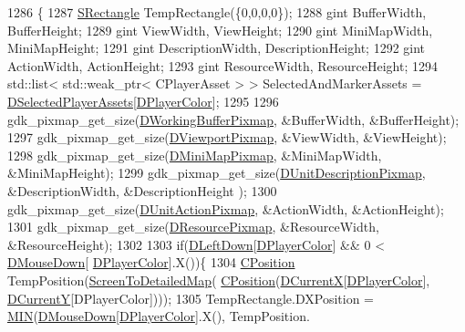 \begin{DoxyCode}
1286                                      \{
1287     \hyperlink{structSRectangle}{SRectangle} TempRectangle(\{0,0,0,0\});
1288     gint BufferWidth, BufferHeight;
1289     gint ViewWidth, ViewHeight;
1290     gint MiniMapWidth, MiniMapHeight;
1291     gint DescriptionWidth, DescriptionHeight;
1292     gint ActionWidth, ActionHeight;
1293     gint ResourceWidth, ResourceHeight;
1294     std::list< std::weak\_ptr< CPlayerAsset > > SelectedAndMarkerAssets = 
      \hyperlink{classCApplicationData_a05c1087d5a5c4ddc14fcb37444f1642b}{DSelectedPlayerAssets}[\hyperlink{classCApplicationData_a53550939b20cba70570f113e4d1c5d02}{DPlayerColor}];
1295 
1296     gdk\_pixmap\_get\_size(\hyperlink{classCApplicationData_afa34cf2780f38dd28c0c811e69d60a97}{DWorkingBufferPixmap}, &BufferWidth, &BufferHeight); 
1297     gdk\_pixmap\_get\_size(\hyperlink{classCApplicationData_ac8801e116d0c49776c9f3db7415287fe}{DViewportPixmap}, &ViewWidth, &ViewHeight); 
1298     gdk\_pixmap\_get\_size(\hyperlink{classCApplicationData_abe3af81659ead5113b7b2f165a88e737}{DMiniMapPixmap}, &MiniMapWidth, &MiniMapHeight); 
1299     gdk\_pixmap\_get\_size(\hyperlink{classCApplicationData_a52e5c1a2ac452c82580ba3f4978c3501}{DUnitDescriptionPixmap}, &DescriptionWidth, &DescriptionHeight
      ); 
1300     gdk\_pixmap\_get\_size(\hyperlink{classCApplicationData_ae264356c833cd581093e3b373cce6620}{DUnitActionPixmap}, &ActionWidth, &ActionHeight); 
1301     gdk\_pixmap\_get\_size(\hyperlink{classCApplicationData_aa9faf270fb2d769855fa5d787a883a83}{DResourcePixmap}, &ResourceWidth, &ResourceHeight); 
1302     
1303     \textcolor{keywordflow}{if}(\hyperlink{classCApplicationData_a2b943f18557c3e4c8cd4550e22e028b6}{DLeftDown}[\hyperlink{classCApplicationData_a53550939b20cba70570f113e4d1c5d02}{DPlayerColor}] && 0 < \hyperlink{classCApplicationData_ad7a43a29e7906e44f09347850796a915}{DMouseDown}[
      \hyperlink{classCApplicationData_a53550939b20cba70570f113e4d1c5d02}{DPlayerColor}].X())\{
1304         \hyperlink{classCPosition}{CPosition} TempPosition(\hyperlink{classCApplicationData_a5c8b0ebf35fddb89b22f035544c32222}{ScreenToDetailedMap}(
      \hyperlink{classCPosition}{CPosition}(\hyperlink{classCApplicationData_a1dc7ee482a39f7978c71365ac540f97a}{DCurrentX}[\hyperlink{classCApplicationData_a53550939b20cba70570f113e4d1c5d02}{DPlayerColor}], \hyperlink{classCApplicationData_a0ba39779ae11c8072258c6ddfebd6052}{DCurrentY}[DPlayerColor])));
1305         TempRectangle.DXPosition = \hyperlink{main_8cpp_a3acffbd305ee72dcd4593c0d8af64a4f}{MIN}(\hyperlink{classCApplicationData_ad7a43a29e7906e44f09347850796a915}{DMouseDown}[\hyperlink{classCApplicationData_a53550939b20cba70570f113e4d1c5d02}{DPlayerColor}].X(), TempPosition.

\end{DoxyCode}
